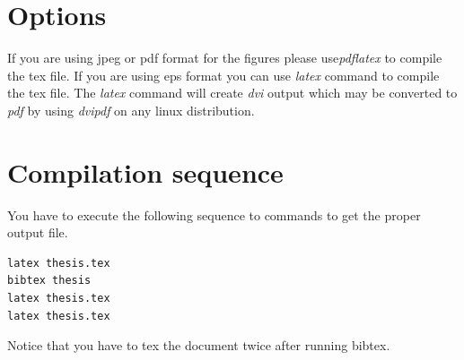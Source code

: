 \documentclass[a4paper,twoside]{iiththesis}
\begin{document}
\section{Options}
If you are using jpeg or pdf format for the figures please use\textit{pdflatex} to compile the tex file. If you are using eps format you can use \textit{latex} command to compile the tex file. The \textit{latex} command will create \textit{dvi} output which may be converted to \textit{pdf} by using \textit{dvipdf} on any linux distribution. 

\section{Compilation sequence}
You have to execute the following sequence to commands to get the proper output file.
\begin{verbatim}
latex thesis.tex
bibtex thesis
latex thesis.tex
latex thesis.tex
\end{verbatim}
Notice that you have to tex the document twice after running bibtex.\\

\clearpage
\newpage
{} %
\end{document}
